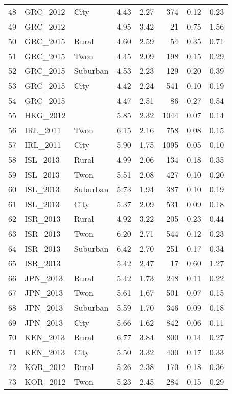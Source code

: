 \documentclass[12pt, titlepage]{article}
\begin{document}
\begin{table}[ht]
\begin{tabular}{rllrrrrr}
		48 & GRC\_2012 & City & 4.43 & 2.27 & 374 & 0.12 & 0.23 \\ 
		49 & GRC\_2012 &  & 4.95 & 3.42 &  21 & 0.75 & 1.56 \\ 
		50 & GRC\_2015 & Rural & 4.60 & 2.59 &  54 & 0.35 & 0.71 \\ 
		51 & GRC\_2015 & Twon & 4.45 & 2.09 & 198 & 0.15 & 0.29 \\ 
		52 & GRC\_2015 & Suburban & 4.53 & 2.23 & 129 & 0.20 & 0.39 \\ 
		53 & GRC\_2015 & City & 4.42 & 2.24 & 541 & 0.10 & 0.19 \\ 
		54 & GRC\_2015 &  & 4.47 & 2.51 &  86 & 0.27 & 0.54 \\ 
		55 & HKG\_2012 &  & 5.85 & 2.32 & 1044 & 0.07 & 0.14 \\ 
		56 & IRL\_2011 & Twon & 6.15 & 2.16 & 758 & 0.08 & 0.15 \\ 
		57 & IRL\_2011 & City & 5.90 & 1.75 & 1095 & 0.05 & 0.10 \\ 
		58 & ISL\_2013 & Rural & 4.99 & 2.06 & 134 & 0.18 & 0.35 \\ 
		59 & ISL\_2013 & Twon & 5.51 & 2.08 & 427 & 0.10 & 0.20 \\ 
		60 & ISL\_2013 & Suburban & 5.73 & 1.94 & 387 & 0.10 & 0.19 \\ 
		61 & ISL\_2013 & City & 5.37 & 2.09 & 531 & 0.09 & 0.18 \\ 
		62 & ISR\_2013 & Rural & 4.92 & 3.22 & 205 & 0.23 & 0.44 \\ 
		63 & ISR\_2013 & Twon & 6.20 & 2.71 & 544 & 0.12 & 0.23 \\ 
		64 & ISR\_2013 & Suburban & 6.42 & 2.70 & 251 & 0.17 & 0.34 \\ 
		65 & ISR\_2013 &  & 5.42 & 2.47 &  17 & 0.60 & 1.27 \\ 
		66 & JPN\_2013 & Rural & 5.42 & 1.73 & 248 & 0.11 & 0.22 \\ 
		67 & JPN\_2013 & Twon & 5.61 & 1.67 & 501 & 0.07 & 0.15 \\ 
		68 & JPN\_2013 & Suburban & 5.59 & 1.70 & 346 & 0.09 & 0.18 \\ 
		69 & JPN\_2013 & City & 5.66 & 1.62 & 842 & 0.06 & 0.11 \\ 
		70 & KEN\_2013 & Rural & 6.77 & 3.84 & 800 & 0.14 & 0.27 \\ 
		71 & KEN\_2013 & City & 5.50 & 3.32 & 400 & 0.17 & 0.33 \\ 
		72 & KOR\_2012 & Rural & 5.26 & 2.38 & 170 & 0.18 & 0.36 \\ 
		73 & KOR\_2012 & Twon & 5.23 & 2.45 & 284 & 0.15 & 0.29 \\ 

\end{tabular}
\end{table}
\end{document}
